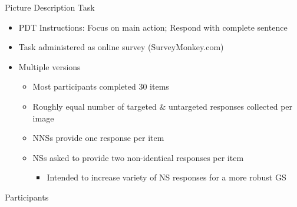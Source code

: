 \documentclass[final,t]{beamer}
\begin{document}
\begin{frame}{}
\begin{columns}[t]
\begin{column}{.33\linewidth}
\begin{block}{Picture Description Task}
\begin{center}
\begin{minipage}{.85\textwidth}
\begin{itemize}
	\item PDT Instructions: Focus on main action; Respond with complete sentence
	\item Task administered as online survey (SurveyMonkey.com)
	\item Multiple versions
	\begin{itemize}
		\item Most participants completed 30 items
		\item Roughly equal number of targeted \& untargeted responses collected per image
		\item NNSs provide one response per item
		\item NSs asked to provide two non-identical responses per item
		\begin{itemize}
			\item Intended to increase variety of NS responses for a more robust GS
		\end{itemize}
	\end{itemize}
\end{itemize}

\end{minipage}
\end{center}
\vspace{-.5em}
\end{block}


\begin{block}{Participants}


\end{block}
\end{column}
\end{columns}
\end{frame}
\end{document}
